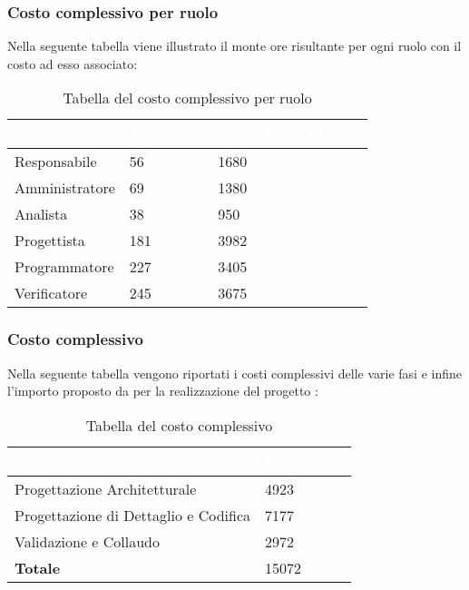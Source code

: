 \subsubsection{Costo complessivo per ruolo}
Nella seguente tabella viene illustrato il monte ore risultante per ogni ruolo con il costo ad esso associato:
{
\renewcommand{\arraystretch}{2}
\begin{longtable}{ C{3cm} C{2cm} C{4cm}}
\caption{Tabella del costo complessivo per ruolo}\\

\textcolor{white}{\textbf{Ruolo}} & 
\textcolor{white}{\textbf{Totale ore}} & 
\textcolor{white}{\textbf{Costo ruolo in euro}}\\	
\endhead
        
Responsabile   &  56 & 1680 \\
Amministratore &  69 & 1380 \\
Analista       &  38 &  950 \\
Progettista    & 181 & 3982 \\
Programmatore  & 227 & 3405 \\
Verificatore   & 245 & 3675 \\
        	
\end{longtable}
}

\subsubsection{Costo complessivo}
Nella seguente tabella vengono riportati i costi complessivi delle varie fasi e infine l'importo proposto da \Gruppo{} per la realizzazione del progetto \NomeProgetto{}:\\
{
\renewcommand{\arraystretch}{2}
\begin{longtable}{ C{5cm} C{5cm}}
\caption{Tabella del costo complessivo}\\

\textcolor{white}{\textbf{Fase}} &
\textcolor{white}{\textbf{Costo Fase}}\\	
\endhead
		
Progettazione Architetturale          &  4923 \\
Progettazione di Dettaglio e Codifica &  7177 \\
Validazione e Collaudo                &  2972 \\
\textbf{Totale}                       & 15072 \\

\end{longtable}
}